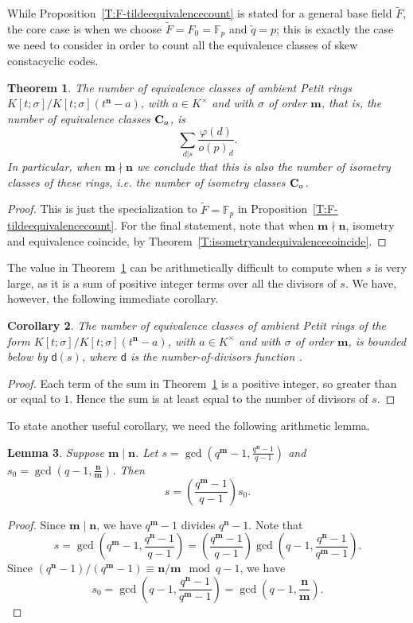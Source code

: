 \documentclass[11pt]{amsart}
\theoremstyle{plain}
\newtheorem{theorem}{Theorem}[section]
\newtheorem{lemma}[theorem]{Lemma}
\newtheorem{corollary}[theorem]{Corollary}
\theoremstyle{definition}
\numberwithin{equation}{section}
\numberwithin{figure}{section}
\newcommand{\FF}{\mathbb{F}}
\newcommand{\Kone}[1]{K[t;\sigma]/K[t;\sigma](t^{\de}-#1)}
\newcommand{\os}{{\mathbf{m}}}  %
\newcommand{\de}{{\mathbf{n}}}  %
\begin{document}
While Proposition~\ref{T:F-tildeequivalencecount} is stated for a general base field $\tilde{F}$, the core case is when we choose $\tilde{F}=F_0=\FF_p$ and $\tilde{q}=p$;  this is exactly the case we need to consider in order to count all the equivalence classes of skew constacyclic codes.




\begin{theorem}\label{them:countingskewconstacodes}
The number of equivalence classes of ambient Petit rings  $\Kone{a}$, with $a\in K^\times$ and
with $\sigma$ of order $\os$, that is, the number of  equivalence classes  ${\bf C}_a$, is
    $$
    \sum_{d|s}\frac{\varphi(d)}{o(p)_d}.
    $$
In particular, when  $\os \nmid\de$ we conclude that this is also the number of \emph{isometry} classes  of these rings, i.e. the number of  \emph{isometry} classes  ${\bf C}_a$.
\end{theorem}

\begin{proof}
This is just the specialization to $\tilde{F}=\FF_p$ in Proposition~\ref{T:F-tildeequivalencecount}. For the final statement, note that when   $\os \nmid\de$, isometry and equivalence coincide, by Theorem~\ref{T:isometryandequivalencecoincide}.
\end{proof}

The value in Theorem~\ref{them:countingskewconstacodes} can be arithmetically difficult to compute when $s$ is very large, as it is a sum of positive integer terms over all the divisors of $s$.  We have, however, the following immediate corollary.

\begin{corollary}\label{cor:lowerbound}
    The number of equivalence classes of ambient Petit rings of the form $\Kone{a}$, with $a\in K^\times$ and
with $\sigma$ of order $\os$, is bounded below by $\mathsf{d}(s)$, where $\mathsf{d}$ is the number-of-divisors function \cite[https://oeis.org/A000005]{OEIS}.
\end{corollary}

\begin{proof}
    Each term of the sum in Theorem~\ref{them:countingskewconstacodes} is a positive integer, so greater than or equal to $1$.  Hence the sum is at least equal to the number of divisors of $s$.
\end{proof}

To state another useful corollary, we need the following arithmetic lemma.

\begin{lemma}\label{L:s_0}
Suppose $\os\mid\de$.    Let $s=\gcd\left( q^\os-1, \frac{q^{\de}-1}{q-1}\right)$ and $s_0 = \gcd(q-1,\frac{\de}{\os})$. Then
    $$
    s = \left(\frac{q^\os-1}{q-1}\right) s_0.
    $$
\end{lemma}
\begin{proof}
Since $\os\mid\de$, we have  $q^{\os}-1$ divides $q^{\de}-1$.  Note that
$$
s = \gcd\left( q^\os-1, \frac{q^{\de}-1}{q-1}\right) = \left( \frac{q^\os-1}{q-1}\right)\gcd\left(q-1,\frac{q^{\de}-1}{q^{\os}-1}\right).
$$
Since $(q^\de-1)/(q^\os-1)\equiv \de/\os\mod q-1$, we have
$$
s_0 = \gcd\left(q-1,\frac{q^{\de}-1}{q^{\os}-1}\right) =\gcd\left(q-1,\frac{\de}{\os}\right).
$$
\end{proof}
\end{document}
